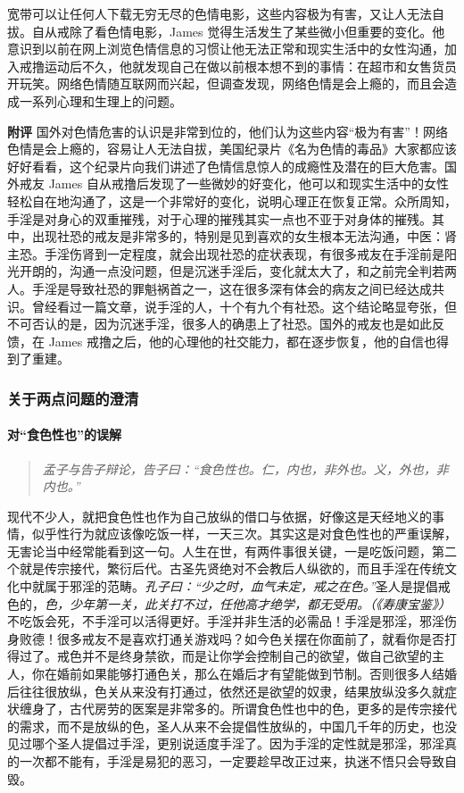 \begin{case}[国外戒色网站摘录]
    宽带可以让任何人下载无穷无尽的色情电影，这些内容极为有害，又让人无法自拔。自从戒除了看色情电影，James 觉得生活发生了某些微小但重要的变化。他意识到以前在网上浏览色情信息的习惯让他无法正常和现实生活中的女性沟通，加入戒撸运动后不久，他就发现自己在做以前根本想不到的事情：在超市和女售货员开玩笑。网络色情随互联网而兴起，但调查发现，网络色情是会上瘾的，而且会造成一系列心理和生理上的问题。

    \textbf{附评} 国外对色情危害的认识是非常到位的，他们认为这些内容“极为有害”！网络色情是会上瘾的，容易让人无法自拔，美国纪录片《名为色情的毒品》大家都应该好好看看，这个纪录片向我们讲述了色情信息惊人的成瘾性及潜在的巨大危害。国外戒友 James 自从戒撸后发现了一些微妙的好变化，他可以和现实生活中的女性轻松自在地沟通了，这是一个非常好的变化，说明心理正在恢复正常。众所周知，手淫是对身心的双重摧残，对于心理的摧残其实一点也不亚于对身体的摧残。其中，出现社恐的戒友是非常多的，特别是见到喜欢的女生根本无法沟通，中医：肾主恐。手淫伤肾到一定程度，就会出现社恐的症状表现，有很多戒友在手淫前是阳光开朗的，沟通一点没问题，但是沉迷手淫后，变化就太大了，和之前完全判若两人。手淫是导致社恐的罪魁祸首之一，这在很多深有体会的病友之间已经达成共识。曾经看过一篇文章，说手淫的人，十个有九个有社恐。这个结论略显夸张，但不可否认的是，因为沉迷手淫，很多人的确患上了社恐。国外的戒友也是如此反馈，在 James 戒撸之后，他的心理他的社交能力，都在逐步恢复，他的自信也得到了重建。
\end{case}

\subsubsection{关于两点问题的澄清}

\paragraph{对“食色性也”的误解}

\begin{quote}\it
    孟子与告子辩论，告子曰：“食色性也。仁，内也，非外也。义，外也，非内也。”
\end{quote}

现代不少人，就把食色性也作为自己放纵的借口与依据，好像这是天经地义的事情，似乎性行为就应该像吃饭一样，一天三次。其实这是对食色性也的严重误解，无害论当中经常能看到这一句。人生在世，有两件事很关键，一是吃饭问题，第二个就是传宗接代，繁衍后代。古圣先贤绝对不会教后人纵欲的，而且手淫在传统文化中就属于邪淫的范畴。\textit{孔子曰：“少之时，血气未定，戒之在色。”}圣人是提倡戒色的，\textit{色，少年第一关，此关打不过，任他高才绝学，都无受用。（《寿康宝鉴》）} 不吃饭会死，不手淫可以活得更好。手淫并非生活的必需品！手淫是邪淫，邪淫伤身败德！很多戒友不是喜欢打通关游戏吗？如今色关摆在你面前了，就看你是否打得过了。戒色并不是终身禁欲，而是让你学会控制自己的欲望，做自己欲望的主人，你在婚前如果能够打通色关，那么在婚后才有望能做到节制。否则很多人结婚后往往很放纵，色关从来没有打通过，依然还是欲望的奴隶，结果放纵没多久就症状缠身了，古代房劳的医案是非常多的。所谓食色性也中的色，更多的是传宗接代的需求，而不是放纵的色，圣人从来不会提倡性放纵的，中国几千年的历史，也没见过哪个圣人提倡过手淫，更别说适度手淫了。因为手淫的定性就是邪淫，邪淫真的一次都不能有，手淫是易犯的恶习，一定要趁早改正过来，执迷不悟只会导致自毁。

